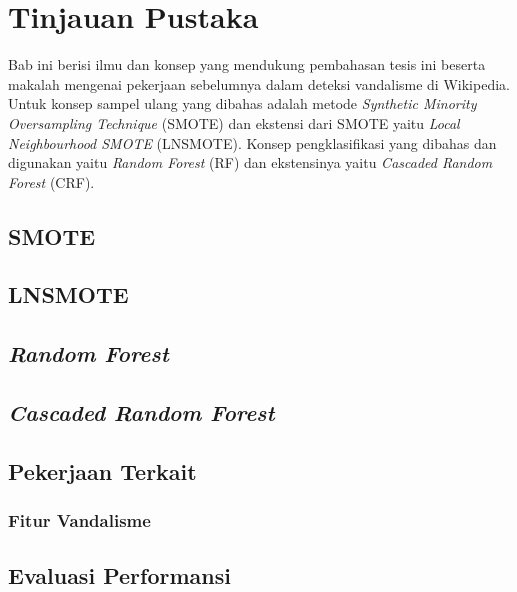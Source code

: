 \chapter{Tinjauan Pustaka}
\label{bab:02}

Bab ini berisi ilmu dan konsep yang mendukung pembahasan tesis ini beserta
makalah mengenai pekerjaan sebelumnya dalam deteksi vandalisme di Wikipedia.
Untuk konsep sampel ulang yang dibahas adalah metode \textit{Synthetic Minority
Oversampling Technique} (SMOTE) dan ekstensi dari SMOTE yaitu
\textit{Local Neighbourhood SMOTE} (LNSMOTE).
Konsep pengklasifikasi yang dibahas dan digunakan yaitu \textit{Random Forest}
(RF) dan ekstensinya yaitu \textit{Cascaded Random Forest} (CRF).

	\section{SMOTE}
	\label{bab:02:smote}
	

	\section{LNSMOTE}
	\label{bab:02:lnsmote}
	

	\section{\textit{Random Forest}}
	\label{bab:02:rf}
	

	\section{\textit{Cascaded Random Forest}}
	\label{bab:02:crf}
	

	\section{Pekerjaan Terkait}\label{bab:02:pekerjaan_terkait}
	

	\subsection{Fitur Vandalisme}
	\label{bab:02:fitur_vandalisme}
	

	\section{Evaluasi Performansi}
	
